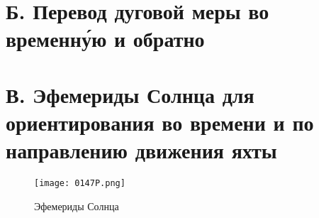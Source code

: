 \clearpage
\section*{Б. Перевод дуговой меры во временн\'{у}ю и обратно}



\clearpage
\section*{В. Эфемериды Солнца для ориентирования во времени и по направлению движения яхты}

\begin{sidewaysfigure*}[!htb]
  \centering
  \texttt{[image: 0147P.png]}
  \caption{Эфемериды Солнца}
  \label{fig:147}
\end{sidewaysfigure*}

